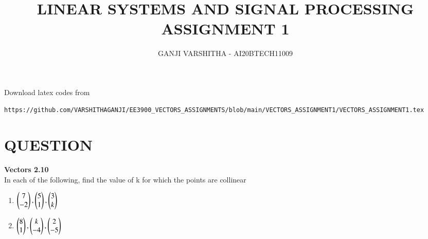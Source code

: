 \documentclass[journal,12pt,twocolumn]{IEEEtran}
\begin{document}
\let\vec\mathbf
\renewcommand{\thefigure}{\theproblem}
\def\putbox#1#2#3{\makebox[0in][l]{\makebox[#1][l]{}\raisebox{\baselineskip}[0in][0in]{\raisebox{#2}[0in][0in]{#3}}}}
     \def\rightbox#1{\makebox[0in][r]{#1}}
     \def\centbox#1{\makebox[0in]{#1}}
     \def\topbox#1{\raisebox{-\baselineskip}[0in][0in]{#1}}
     \def\midbox#1{\raisebox{-0.5\baselineskip}[0in][0in]{#1}}
\vspace{3cm}
\title{\textbf{LINEAR SYSTEMS AND SIGNAL PROCESSING \\ ASSIGNMENT 1}}
\author{GANJI VARSHITHA - AI20BTECH11009}
\maketitle
\newpage
\bigskip
\renewcommand{\thefigure}{\arabic{figure}}
\renewcommand{\thetable}{\arabic{table}}
Download latex codes from 
%
\begin{lstlisting}
https://github.com/VARSHITHAGANJI/EE3900_VECTORS_ASSIGNMENTS/blob/main/VECTORS_ASSIGNMENT1/VECTORS_ASSIGNMENT1.tex
\end{lstlisting}
\section*{QUESTION}
\textbf{Vectors 2.10}
\\
In each of the following, find the value of k for which the points are collinear

\begin{enumerate}
   \item  $\begin{pmatrix}7\\-2\end{pmatrix}, \begin{pmatrix}5 \\ 1\end{pmatrix}, \begin{pmatrix}3 \\ k\end{pmatrix}$
   \item  $\begin{pmatrix}8\\1\end{pmatrix}, \begin{pmatrix}k \\ -4\end{pmatrix}, \begin{pmatrix}2 \\ -5\end{pmatrix}$
 
\end{enumerate}
\end{document}
